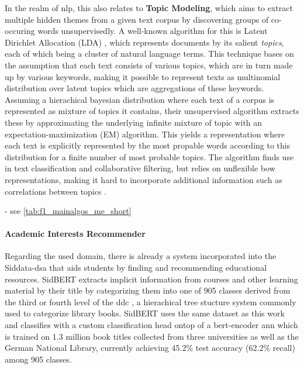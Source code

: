 In the realm of \gls{nlp}, this also relates to \textbf{Topic Modeling}, which aims to extract multiple hidden themes from a given text corpus by discovering groups of co-occuring words unsupervisedly. A well-known algorithm for this is Latent Dirichlet Allocation (LDA) \cite{Blei2003}, which represents documents by its salient \textit{topics}, each of which being a cluster of natural language terms. This technique bases on the assumption that each text consists of various topics, which are in turn made up by various keywords, making it possible to represent texts as multinomial distribution over latent topics which are aggregations of these keywords. Assuming a hierachical bayesian distribution where each text of a corpus is represented as mixture of topics it contains, their unsupervised algorithm extracts these by approximating the underlying infinite mixture of topic with an expectation-maximization (EM) algorithm. This yields a representation where each text is explicitly represented by the most propable words according to this distribution for a finite number of most probable topics. The algorithm finds use in text classification and collaborative filtering, but relies on unflexible \gls{bow} representations, making it hard to incorporate additional information such as correlations between topics \cite{Ager2018}.

 - see \autoref{tab:f1_mainalgos_me_short}


\paragraph{Academic Interests Recommender}
\label{sec:sidbert}
Regarding the used domain, there is already a system incorporated into the Siddata-\gls{dsa} that aids students by finding and recommending educational resources. SidBERT \cite{Schrumpf2021DELPHI} extracts implicit information from courses and other learning material by their title by categorizing them into one of 905 classes derived from the third or fourth level of the \gls{ddc} \cite{Dewey1876}, a hierachical tree stucture system commonly used to categorize library books. SidBERT uses the same dataset as this work and classifies with a custom classification head ontop of a \gls{bert}-encoder \gls{ann} which is trained on 1.3 million book titles collected from three universities as well as the German National Library, currently achieving 45.2\% test accuracy (62.2\% recall) among 905 classes.



